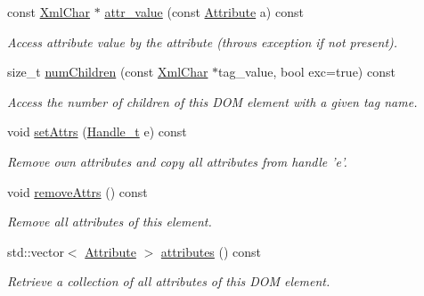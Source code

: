 \begin{DoxyCompactItemize}
const \hyperlink{namespace_d_d4hep_1_1_x_m_l_a09e5d9cc86ed782f6826dfe0778c1815}{XmlChar} $\ast$ \hyperlink{class_d_d4hep_1_1_x_m_l_1_1_element_a685eb737e52bc28d9d7f3aff51f47bb5}{attr\_\-value} (const \hyperlink{namespace_d_d4hep_1_1_x_m_l_a5c19b7116be99d69b4b22d911357baaf}{Attribute} a) const 
\begin{DoxyCompactList}\small\item\em Access attribute value by the attribute (throws exception if not present). \item\end{DoxyCompactList}\item 
size\_\-t \hyperlink{class_d_d4hep_1_1_x_m_l_1_1_element_a985dff64b8864d1954d7dc7a1a77b1af}{numChildren} (const \hyperlink{namespace_d_d4hep_1_1_x_m_l_a09e5d9cc86ed782f6826dfe0778c1815}{XmlChar} $\ast$tag\_\-value, bool exc=true) const 
\begin{DoxyCompactList}\small\item\em Access the number of children of this DOM element with a given tag name. \item\end{DoxyCompactList}\item 
void \hyperlink{class_d_d4hep_1_1_x_m_l_1_1_element_ac383b5cad9e06224a243d899c3a8c100}{setAttrs} (\hyperlink{class_d_d4hep_1_1_x_m_l_1_1_handle__t}{Handle\_\-t} e) const 
\begin{DoxyCompactList}\small\item\em Remove own attributes and copy all attributes from handle 'e'. \item\end{DoxyCompactList}\item 
void \hyperlink{class_d_d4hep_1_1_x_m_l_1_1_element_a69779ea432a174b590f120949176ef33}{removeAttrs} () const 
\begin{DoxyCompactList}\small\item\em Remove all attributes of this element. \item\end{DoxyCompactList}\item 
std::vector$<$ \hyperlink{namespace_d_d4hep_1_1_x_m_l_a5c19b7116be99d69b4b22d911357baaf}{Attribute} $>$ \hyperlink{class_d_d4hep_1_1_x_m_l_1_1_element_a66b2ab211629a9f748b7504d21609cc0}{attributes} () const 
\begin{DoxyCompactList}\small\item\em Retrieve a collection of all attributes of this DOM element. \item\end{DoxyCompactList}\item 

\end{DoxyCompactItemize}
